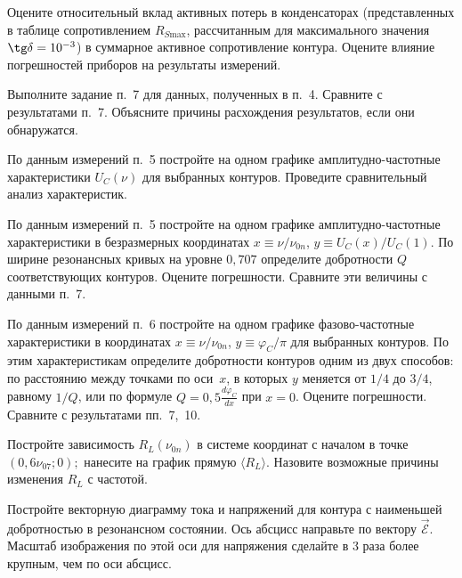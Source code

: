 \begin{lab:task}

Оцените относительный вклад активных потерь в конденсаторах
(представленных в таблице сопротивлением $R_{S\text{max}}$, рассчитанным
для максимального значения $\tg\delta=10^{-3}$) в суммарное активное
сопротивление контура. Оцените влияние погрешностей приборов на результаты
измерений.

    \item *Выполните задание п.~7 для данных, полученных в п.~4. 
    Сравните с результатами п.~7. Объясните причины расхождения результатов, 
    если они обнаружатся.

    \item По данным измерений п.~5 постройте на одном графике
амплитудно-частотные характеристики $U_C(\nu)$ для выбранных
контуров. Проведите сравнительный анализ характеристик.

    \item По данным измерений п.~5 постройте на одном графике
амплитудно-частотные характеристики в безразмерных координатах 
$x\equiv \nu/\nu_{0n}$, $y\equiv U_C(x)/U_C(1)$. 
По ширине резонансных кривых на уровне $0,707$ определите добротности $Q$ 
соответствующих контуров. Оцените погрешности. 
Сравните эти величины с данными п.~7.

    \item По данным измерений п.~6 постройте на одном графике
фазово-частотные характеристики в координатах 
$x\equiv \nu/\nu_{0n}$, $y\equiv\varphi_C/\pi$ для выбранных контуров. 
По этим характеристикам определите
добротности контуров одним из двух способов: по расстоянию между точками по оси~$x$, 
в которых $y$ меняется от $1/4$ до $3/4$, равному $1/Q$, или по формуле
$Q=0,5\frac{d\varphi_C}{dx}$ при $x=0$. Оцените погрешности. 
Сравните с результатами пп.~7,~10.

    \item Постройте зависимость $R_L(\nu_{0n})$ в системе координат с началом 
    в точке $(0,6\nu_{07};0);$ нанесите на график прямую $\langle R_L\rangle$. 
    Назовите возможные причины изменения $R_L$ с частотой.

    \item Постройте векторную диаграмму тока и напряжений для контура 
    с наименьшей добротностью в резонансном состоянии. Ось абсцисс направьте 
    по вектору $\vec{\mathcal{E}}.$ Масштаб изображения по этой оси
    для напряжения сделайте в 3 раза более крупным, чем по оси абсцисс.

\end{lab:task}


